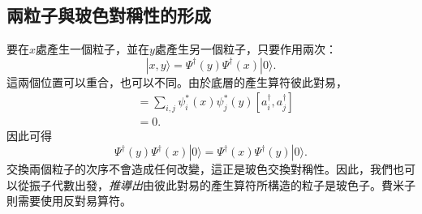 \begin{classroomqa}
\end{classroomqa}

\subsection{兩粒子與玻色對稱性的形成}

要在\(x\)處產生一個粒子，並在\(y\)處產生另一個粒子，只要作用兩次：
\begin{equation}
|x,y\rangle
=\Psi^\dagger(y)\Psi^\dagger(x)|0\rangle.
\label{eq:l06-two-particle-state}
\end{equation}
這兩個位置可以重合，也可以不同。由於底層的產生算符彼此對易，
\begin{align}
[\Psi^\dagger(x),\Psi^\dagger(y)]
&=\sum_{i,j}\psi_i^*(x)\psi_j^*(y)
[a_i^\dagger,a_j^\dagger] \\
&=0.
\end{align}
因此可得
\begin{equation}
\Psi^\dagger(y)\Psi^\dagger(x)|0\rangle
=\Psi^\dagger(x)\Psi^\dagger(y)|0\rangle.
\label{eq:l06-boson-exchange}
\end{equation}
交換兩個粒子的次序不會造成任何改變，這正是玻色交換對稱性。因此，我們也可以從振子代數出發，\emph{推導出}由彼此對易的產生算符所構造的粒子是玻色子。費米子則需要使用反對易算符。

\begin{classroomqa}
\end{classroomqa}

\begin{classroomqa}
\end{classroomqa}

\begin{classroomqa}
\end{classroomqa}

